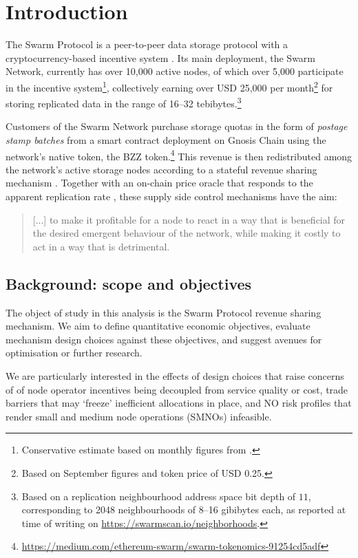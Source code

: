 \maketitlepage
\section{Introduction}

The Swarm Protocol is a peer-to-peer data storage protocol with a cryptocurrency-based incentive system \cite{book-of-swarm}.
%
Its main deployment, the Swarm Network, currently has over 10,000 active nodes, of which over 5,000 participate in the incentive system\footnote{Conservative estimate based on monthly figures from \cite{soft}.}, collectively earning over USD 25,000 per month\footnote{Based on September figures and token price of USD 0.25.} for storing replicated data in the range of 16--32 tebibytes.\footnote{Based on a replication neighbourhood address space bit depth of $11$, corresponding to 2048 neighbourhoods of 8--16 gibibytes each, as reported at time of writing on \url{https://swarmscan.io/neighborhoods}.}

Customers of the Swarm Network purchase storage quotas in the form of \emph{postage stamp batches} \cite[\S3.3]{book-of-swarm} from a smart contract deployment on Gnosis Chain using the network's native token, the BZZ token.\footnote{\url{https://medium.com/ethereum-swarm/swarm-tokenomics-91254cd5adf}}
%
This revenue is then redistributed among the network's active storage nodes according to a stateful revenue sharing mechanism \cite[\S3.4]{book-of-swarm}.
%
Together with an on-chain price oracle that responds to the apparent replication rate \cite[\S3.4.5]{book-of-swarm}, these supply side control mechanisms have the aim:
%
\begin{quote}
%
  [...] to make it profitable for a node to react in a way that is beneficial for the desired emergent behaviour of the network, while making it costly to act in a way that is detrimental. \hfill\cite[79]{book-of-swarm}
%
\end{quote}


\subsection{Background: scope and objectives}

The object of study in this analysis is the Swarm Protocol revenue sharing mechanism. 
%
We aim to define quantitative economic objectives, evaluate mechanism design choices against these objectives, and suggest avenues for optimisation or further research.

We are particularly interested in the effects of design choices that raise concerns of of node operator incentives being decoupled from service quality or cost, trade barriers that may `freeze' inefficient allocations in place, and NO risk profiles that render small and medium node operations (SMNOs) infeasible.

